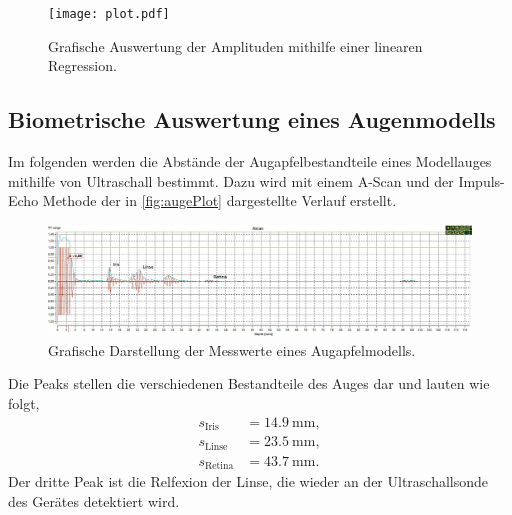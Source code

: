 \begin{figure}[H]
  \centering
  \texttt{[image: plot.pdf]}
  \caption{Grafische Auswertung der Amplituden mithilfe einer linearen Regression.}
  \label{fig:plot}
\end{figure}

\subsection{Biometrische Auswertung eines Augenmodells}
\label{subsec:auge}

Im folgenden werden die Abstände der Augapfelbestandteile eines Modellauges mithilfe von Ultraschall bestimmt. 
Dazu wird mit einem A-Scan und der Impuls-Echo Methode der in \autoref{fig:augePlot} dargestellte Verlauf erstellt.

\begin{figure}[H]
  \centering
  \includegraphics[width = \textwidth]{data/Auge.png}
  \caption{Grafische Darstellung der Messwerte eines Augapfelmodells.}
  \label{fig:augePlot}
\end{figure}

Die Peaks stellen die verschiedenen Bestandteile des Auges dar und lauten wie folgt,
\begin{align*}
  s_{\text{Iris}} &= \SI{14,9}{\mm}, \\
  s_{\text{Linse}} &= \SI{23,5}{\mm}, \\
  s_{\text{Retina}} &= \SI{43,7}{\mm}.
\end{align*}
Der dritte Peak ist die Relfexion der Linse, die wieder an der Ultraschallsonde des Gerätes detektiert wird.